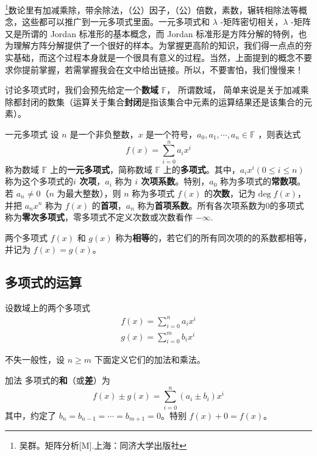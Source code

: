 
\footnote{吴群。矩阵分析[M].上海：同济大学出版社}数论里有加减乘除，带余除法，（公）因子，（公）倍数，素数，辗转相除法等概念，这些都可以推广到一元多项式里面。一元多项式和 $\lambda$ -矩阵密切相关，$\lambda$ -矩阵又是所谓的 Jordan 标准形的基本概念，而 Jordan 标准形是方阵分解的特例，也为理解方阵分解提供了一个很好的样本。为掌握更高阶的知识，我们得一点点的夯实基础，而这个过程本身就是一个很具有意义的过程。当然，上面提到的概念不要求你提前掌握，若需掌握我会在文中给出链接。所以，不要害怕，我们慢慢来！

讨论多项式时，我们会预先给定一个\textbf{数域} $\mathbb{F}$， 所谓数域， 简单来说是关于加减乘除都封闭的数集（运算关于集合\textbf{封闭}是指该集合中元素的运算结果还是该集合的元素）。
\begin{definition}{一元多项式}\label{OnePol_def1}
设 $n$ 是一个非负整数，$x$ 是一个符号，$a_0,a_1,\cdots,a_n\in \mathbb{F}$ ，则表达式
\begin{equation}
f(x)=\sum_{i=0}^{n}a_i x^i
\end{equation}
称为数域 $\mathbb{F}$ 上的\textbf{一元多项式}，简称数域 $\mathbb{F}$ 上的\textbf{多项式}。其中，$a_ix^i(0\leq i\leq n)$ 称为这个多项式的\textbf{$i$ 次项}，$a_i$ 称为 \textbf{$i$ 次项系数}。特别，$a_0$ 称为多项式的\textbf{常数项}。若 $a_n\neq 0$（$n$ 为最大整数），则 $n$ 称为多项式 $f(x)$ 的\textbf{次数}，记为 $\mathrm{deg}\;f(x)$，并把 $a_nx^n$ 称为 $f(x)$ 的\textbf{首项}，$a_n$ 称为\textbf{首项系数}。所有各次项系数为0的多项式称为\textbf{零次多项式}，零多项式不定义次数或次数看作 $-\infty$.
\end{definition}
两个多项式 $f(x)$ 和 $g(x)$ 称为\textbf{相等}的，若它们的所有同次项的的系数都相等，并记为 $f(x)=g(x)$。
\subsection{多项式的运算}
设数域上的两个多项式
\begin{equation}
\begin{aligned}
f(x)=\sum_{i=0}^{n}a_ix^i\\
g(x)=\sum_{i=0}^{m}b_ix^i
\end{aligned}
\end{equation}

不失一般性，设 $n\geq m$
下面定义它们的加法和乘法。
\begin{definition}{加法}
多项式的\textbf{和}（或\textbf{差}）为
\begin{equation}
f(x)\pm g(x)=\sum_{i=0}^n (a_i\pm b_i)x^i
\label{OnePol_eq1}
\end{equation}
其中，约定了 $b_n=b_{n-1}=\cdots=b_{m+1}=0$。特别 $f(x)+0=f(x)$。
\end{definition}

